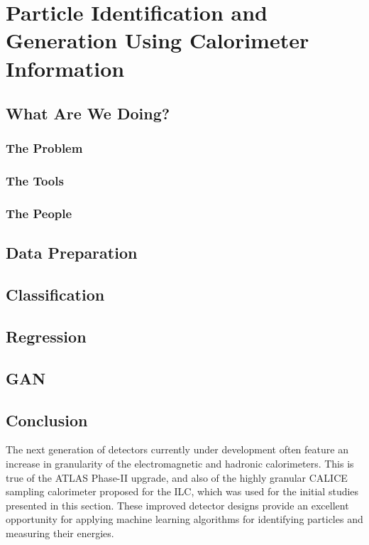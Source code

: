 \chapter{Particle Identification and Generation Using Calorimeter Information}

\section{What Are We Doing?}

\subsection{The Problem}

\subsection{The Tools}

\subsection{The People}

\section{Data Preparation}

\section{Classification}

\section{Regression}

\section{GAN}

\section{Conclusion}


The next generation of detectors currently under development often feature an increase in granularity of the electromagnetic and hadronic calorimeters. This is true of the ATLAS Phase-II upgrade, and also of the highly granular CALICE sampling calorimeter proposed for the ILC, which was used for the initial studies presented in this section. These improved detector designs provide an excellent opportunity for applying machine learning algorithms for identifying particles and measuring their energies.

